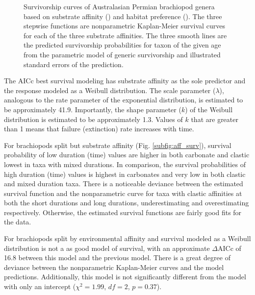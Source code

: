 \documentclass[12pt,letterpaper]{article}
\begin{document}
\begin{figure}[ht]
\begin{subfigure}[b]{0.5\textwidth}
      \label{subfig:env_surv}
    \end{subfigure}
    \caption{Survivorship curves of Australasian Permian brachiopod genera based on substrate affinity () and habitat preference (). The three stepwise functions are nonparametric Kaplan-Meier survival curves for each of the three substrate affinities. The three smooth lines are the predicted survivorship probabilities for taxon of the given age from the parametric model of generic survivorship and illustrated standard errors of the prediction.}
  \label{fig:brach_surv}
\end{figure}

The AICc best survival modeling has substrate affinity as the sole predictor and the response modeled as a Weibull distribution. The scale parameter (\(\lambda\)), analogous to the rate parameter of the exponential distribution, is estimated to be approximately 41.9. Importantly, the shape parameter (\(k\)) of the Weibull distribution is estimated to be approximately 1.3. Values of \(k\) that are greater than 1 means that failure (extinction) rate increases with time. %

For brachiopods split but substrate affinity (Fig. \ref{subfig:aff_surv}), survival probability of low duration (time) values are higher in both carbonate and clastic lowest in taxa with mixed durations. In comparison, the survival probabilities of high duration (time) values is highest in carbonates and very low in both clastic and mixed duration taxa. There is a noticeable deviance between the estimated survival function and the nonparametric curve for taxa with clastic affinities at both the short durations and long durations, underestimating and overestimating respectively. Otherwise, the estimated survival functions are fairly good fits for the data. 

For brachiopods split by environmental affinity and survival modeled as a Weibull distribution is not a as good model of survival, with an approximate \(\Delta\)AICc of 16.8 between this model and the previous model. There is a great degree of deviance between the nonparametric Kaplan-Meier curves and the model predictions. Additionally, this model is not significantly different from the model with only an intercept (\(\chi^{2} = 1.99\), \(df = 2\), \(p = 0.37\)).
\end{document}
